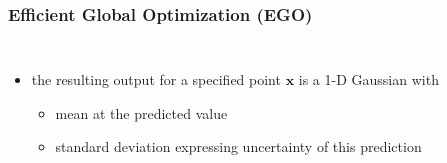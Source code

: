 \documentclass[sans,mathserif]{beamer}
\newcommand{\xx}{\mathrm{\mathbf{x}}}
\newcommand{\blue}[1]{{\color{blue} #1}}
\begin{document}
\begin{frame}
  \frametitle{Efficient Global Optimization (EGO)}
  \begin{columns}[T]
  \column{5cm}
    \begin{itemize}
      \item the resulting output for a specified point $\xx$ is a 1-D Gaussian with
        \begin{itemize}
          \item \blue{mean} at the predicted value
          \item \blue{standard deviation} expressing uncertainty of this prediction
        \end{itemize}
    \end{itemize}
  \column{5.5cm}
\end{columns}
\end{frame}
\end{document}
